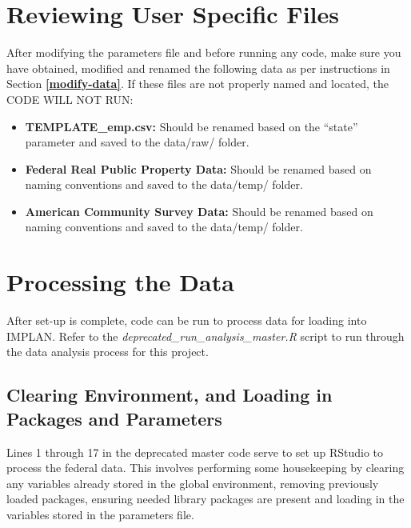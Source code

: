 \documentclass[
]{book}
\providecommand{\tightlist}{%
  \setlength{\itemsep}{0pt}\setlength{\parskip}{0pt}}
\begin{document}
\hypertarget{review-files}{%
\section{Reviewing User Specific Files}\label{review-files}}

After modifying the parameters file and before running any code, make sure you have obtained, modified and renamed the following data as per instructions in Section \textbf{\ref{modify-data}}. If these files are not properly named and located, the CODE WILL NOT RUN:

\begin{itemize}
\tightlist
\item
  \textbf{TEMPLATE\_emp.csv:} Should be renamed based on the ``state'' parameter and saved to the data/raw/ folder.\\
\item
  \textbf{Federal Real Public Property Data:} Should be renamed based on naming conventions and saved to the data/temp/ folder.\\
\item
  \textbf{American Community Survey Data:} Should be renamed based on naming conventions and saved to the data/temp/ folder.
\end{itemize}

\hypertarget{processing-data}{%
\section{Processing the Data}\label{processing-data}}

After set-up is complete, code can be run to process data for loading into IMPLAN. Refer to the \emph{deprecated\_run\_analysis\_master.R} script to run through the data analysis process for this project.

\hypertarget{set-up-env}{%
\subsection{Clearing Environment, and Loading in Packages and Parameters}\label{set-up-env}}

Lines 1 through 17 in the deprecated master code serve to set up RStudio to process the federal data. This involves performing some housekeeping by clearing any variables already stored in the global environment, removing previously loaded packages, ensuring needed library packages are present and loading in the variables stored in the parameters file.
\end{document}
